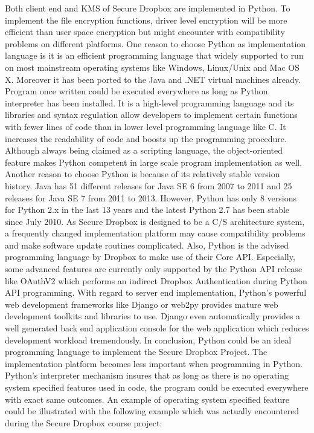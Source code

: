Both client end and KMS of Secure Dropbox are implemented in Python. To implement the file encryption functions, driver level encryption will be more efficient than user space encryption but might encounter with compatibility problems on different platforms. One reason to choose Python as implementation language is it is an efficient programming language that widely supported to run on most mainstream operating systems like Windows, Linux/Unix and Mac OS X. Moreover it has been ported to the Java and .NET virtual machines already. Program once written could be executed everywhere as long as Python interpreter has been installed. It is a high-level programming language and its libraries and syntax regulation allow developers to implement certain functions with fewer lines of code than in lower level programming language like C. It increases the readability of code and boosts up the programming procedure. Although always being claimed as a scripting language, the object-oriented feature makes Python competent in large scale program implementation as well. Another reason to choose Python is because of its relatively stable version history. Java has 51 different releases for Java SE 6 from 2007 to 2011 and 25 releases for Java SE 7 from 2011 to 2013. However, Python has only 8 versions for Python 2.x in the last 13 years and the latest Python 2.7 has been stable since July 2010. As Secure Dropbox is designed to be a C/S architecture system, a frequently changed implementation platform may cause compatibility problems and make software update routines complicated. Also, Python is the advised programming language by Dropbox to make use of their Core API. Especially, some advanced features are currently only supported by the Python API release like OAuthV2 which performs an indirect Dropbox Authentication during Python API programming. With regard to server end implementation, Python’s powerful web development frameworks like Django or web2py provides mature web development toolkits and libraries to use. Django even automatically provides a well generated back end application console for the web application which reduces development workload tremendously. In conclusion, Python could be an ideal programming language to implement the Secure Dropbox Project.
The implementation platform becomes less important when programming in Python. Python’s interpreter mechanism insures that as long as there is no operating system specified features used in code, the program could be executed everywhere with exact same outcomes. An example of operating system specified feature could be illustrated with the following example which was actually encountered during the Secure Dropbox course project:

